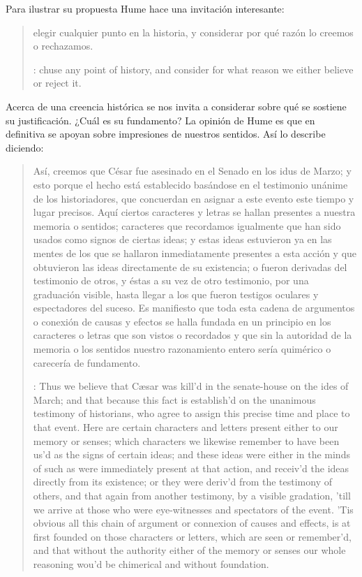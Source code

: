 Para ilustrar su propuesta Hume hace una invitación interesante:
\blockquote[{\cite[?]{humetreatise}}: chuse any point of history, and consider
for what reason we either believe or reject it.]{elegir cualquier punto en la
  historia, y considerar por qué razón lo creemos o rechazamos.} Acerca de una
creencia histórica se nos invita a considerar sobre qué se sostiene su
justificación. ¿Cuál es su fundamento? La opinión de Hume es que en definitiva
se apoyan sobre impresiones de nuestros sentidos. Así lo describe diciendo:
\blockquote[{\cite[?]{humetratise}}: Thus we believe that Cæsar was kill’d in
the senate-house on the ides of March; and that because this fact is establish’d
on the unanimous testimony of historians, who agree to assign this precise time
and place to that event. Here are certain characters and letters present either
to our memory or senses; which characters we likewise remember to have been us’d
as the signs of certain ideas; and these ideas were either in the minds of such
as were immediately present at that action, and receiv’d the ideas directly from
its existence; or they were deriv’d from the testimony of others, and that again
from another testimony, by a visible gradation, ’till we arrive at those who
were eye-witnesses and spectators of the event. ’Tis obvious all this chain of
argument or connexion of causes and effects, is at first founded on those
characters or letters, which are seen or remember’d, and that without the
authority either of the memory or senses our whole reasoning wou’d be chimerical
and without foundation.]{Así, creemos que César fue asesinado en el Senado en
  los idus de Marzo; y esto porque el hecho está establecido basándose en el
  testimonio unánime de los historiadores, que concuerdan en asignar a este
  evento este tiempo y lugar precisos. Aquí ciertos caracteres y letras se
  hallan presentes a nuestra memoria o sentidos; caracteres que recordamos
  igualmente que han sido usados como signos de ciertas ideas; y estas ideas
  estuvieron ya en las mentes de los que se hallaron inmediatamente presentes a
  esta acción y que obtuvieron las ideas directamente de su existencia; o fueron
  derivadas del testimonio de otros, y éstas a su vez de otro testimonio, por
  una graduación visible, hasta llegar a los que fueron testigos oculares y
  espectadores del suceso. Es manifiesto que toda esta cadena de argumentos o
  conexión de causas y efectos se halla fundada en un principio en los
  caracteres o letras que son vistos o recordados y que sin la autoridad de la
  memoria o los sentidos nuestro razonamiento entero sería quimérico o carecería
  de fundamento.}

